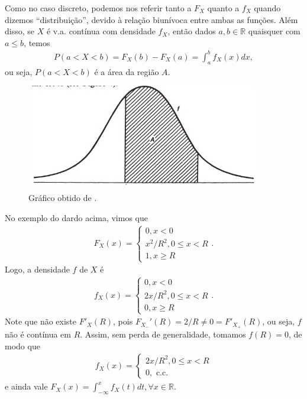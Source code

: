 \documentclass[../Notas.tex]{subfiles}
\begin{document}
\begin{remark}
Como no caso discreto, podemos nos referir tanto a $F_X$ quanto a $f_X$ quando dizemos ``distribuição'', devido à relação biunívoca entre ambas as funções. Além disso, se $X$ é v.a. contínua com densidade $f_X$, então dados $a,b\in\mathbb{R}$ quaisquer com $a\leq b$, temos
\begin{align*}
    P(a < X < b) = F_X(b) - F_X(a) = \int_a^b f_X(x) dx,
\end{align*}
ou seja, $P(a < X < b)$ é a área da região $A$.
\begin{figure}[H]
    \centering
    \includegraphics[width=\textwidth]{Imagens/p105.png}
    \caption{Gráfico obtido de \cite{Hoel}.}
\end{figure}
\end{remark}

\begin{example}
No exemplo do dardo acima, vimos que
\begin{align*}
    F_X(x) = \begin{cases}
    0, x < 0 \\
    x^2/R^2, 0\leq x < R \\
    1, x\geq R
    \end{cases}.
\end{align*}
Logo, a densidade $f$ de $X$ é
\begin{align*}
    f_X(x) = \begin{cases}
    0, x < 0 \\
    2x/R^2, 0\leq x < R \\
    0, x\geq R
    \end{cases}.
\end{align*}
Note que não existe $F'_X(R)$, pois $F_{X_-}'(R) = 2/R \neq 0 = F'_{X_+}(R)$, ou seja, $f$ não é contínua em $R$. Assim, sem perda de generalidade, tomamos $f(R) = 0$, de modo que
\begin{align*}
    f_X(x) = \begin{cases}
    2x/R^2, 0\leq x < R \\
    0, \text{ c.c.}
    \end{cases}
\end{align*}
e ainda vale $\displaystyle{ F_X(x) = \int_{-\infty}^x f_X(t) dt, \forall x\in\mathbb{R}. }$
\end{example}
\end{document}
